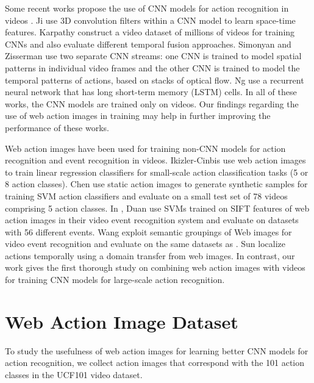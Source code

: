 \documentclass[10pt,twocolumn,letterpaper]{article}
\begin{document}
Some recent works propose the use of CNN models for action recognition in videos \cite{ji20133d, KarpathyTSLSF14, ng2015beyond, simonyan2014very}. Ji \etal \cite{ji20133d} use 3D convolution filters within a CNN model to learn space-time features. Karpathy \etal \cite{KarpathyTSLSF14} construct a video dataset of millions of videos for training CNNs and also evaluate different temporal fusion approaches. Simonyan and Zisserman \cite{simonyan2014very} use two separate CNN streams: one CNN is trained to model spatial patterns in individual video frames and the other CNN is trained to model the temporal patterns of actions,  based on stacks of optical flow. Ng \etal \cite{ng2015beyond} use a recurrent neural network that has long short-term memory (LSTM) cells. In all of these works, the CNN models are trained only on videos. Our findings regarding the use of web action images in training may help in further improving the performance of these works.

Web action images have been used for training non-CNN models for action recognition \cite{chen2013watching, ikizler2012web} and event recognition \cite{duan2012exploiting, wang2014annotate} in videos. Ikizler-Cinbis \etal \cite{ikizler2012web} use web action images to train linear regression classifiers for small-scale action classification tasks (5 or 8 action classes). Chen \etal \cite{chen2013watching} use static action images to generate synthetic samples for training SVM action classifiers and evaluate on a small test set of 78 videos comprising 5 action classes. In \cite{duan2012exploiting}, Duan \etal use SVMs trained on SIFT features of web action images in their video event recognition system and evaluate on datasets with 56 different events. Wang \etal \cite{wang2014annotate} exploit semantic groupings of Web images for video event recognition and evaluate on the same datasets as  \cite{duan2012exploiting}. Sun \etal \cite{sun2015temporal} localize actions temporally using a domain transfer from web images. In contrast, our work gives the first thorough study on combining web action images with videos for training CNN models for large-scale action recognition.

\section{Web Action Image Dataset}
\label{sec:dataset}

To study the usefulness of web action images for learning better CNN models for action recognition, we collect action images that correspond with the 101 action classes in the UCF101 video dataset.
\end{document}
